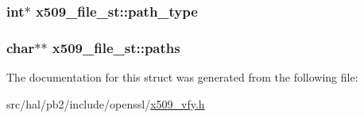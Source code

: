 \subsubsection[{\texorpdfstring{path\+\_\+type}{path_type}}]{\setlength{\rightskip}{0pt plus 5cm}int$\ast$ x509\+\_\+file\+\_\+st\+::path\+\_\+type}\hypertarget{structx509__file__st_a2ecd2de35656eb382770bcb7317cb3f4}{}\label{structx509__file__st_a2ecd2de35656eb382770bcb7317cb3f4}
\subsubsection[{\texorpdfstring{paths}{paths}}]{\setlength{\rightskip}{0pt plus 5cm}char$\ast$$\ast$ x509\+\_\+file\+\_\+st\+::paths}\hypertarget{structx509__file__st_aa90fe6de68309d7572b7516787bf235f}{}\label{structx509__file__st_aa90fe6de68309d7572b7516787bf235f}


The documentation for this struct was generated from the following file\+:\begin{DoxyCompactItemize}
\item 
src/hal/pb2/include/openssl/\hyperlink{x509__vfy_8h}{x509\+\_\+vfy.\+h}\end{DoxyCompactItemize}
